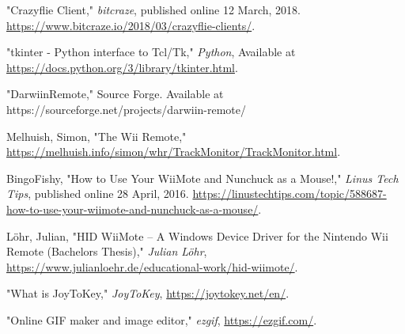 \setlength{\parindent}{0pt}

\begin{thebibliography}{9}
    
    

"Crazyflie Client," \emph{bitcraze}, published online 12 March, 2018. \url{https://www.bitcraze.io/2018/03/crazyflie-clients/}. \hfill

"tkinter - Python interface to Tcl/Tk," \emph{Python}, Available at  \url{https://docs.python.org/3/library/tkinter.html}.

"DarwiinRemote," Source Forge. Available at https://sourceforge.net/projects/darwiin-remote/ \hfill

Melhuish, Simon, "The Wii Remote," \url{https://melhuish.info/simon/whr/TrackMonitor/TrackMonitor.html}. \hfill

BingoFishy, "How to Use Your WiiMote and Nunchuck as a Mouse!," \emph{Linus Tech Tips}, published online 28 April, 2016. \url{https://linustechtips.com/topic/588687-how-to-use-your-wiimote-and-nunchuck-as-a-mouse/}. \hfill

L\"{o}hr,  Julian, "HID WiiMote – A Windows Device Driver for the Nintendo Wii Remote (Bachelors Thesis)," \emph{Julian L\"{o}hr}, \url{https://www.julianloehr.de/educational-work/hid-wiimote/}. \hfill

"What is JoyToKey," \emph{JoyToKey}, \url{https://joytokey.net/en/}. \hfill

"Online GIF maker and image editor," \emph{ezgif}, \url{https://ezgif.com/}. \hfill

\end{thebibliography}